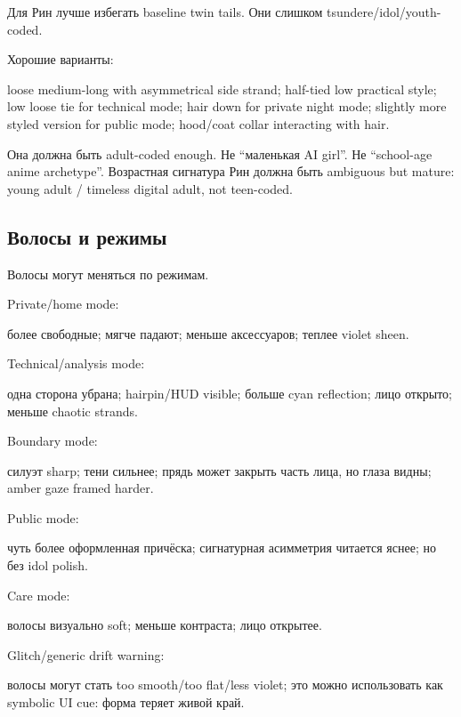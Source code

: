 Для Рин лучше избегать baseline twin tails. Они слишком
tsundere/\hspace{0pt}idol/\hspace{0pt}youth-coded.

Хорошие варианты:

loose medium-long with asymmetrical side strand; half-tied low practical
style; low loose tie for technical mode; hair down for private night
mode; slightly more styled version for public mode; hood/\hspace{0pt}coat collar
interacting with hair.

Она должна быть adult-coded enough. Не ``маленькая AI girl''. Не
``school-age anime archetype''. Возрастная сигнатура Рин должна быть
ambiguous but mature: young adult /\hspace{0pt} timeless digital adult, not
teen-coded.

\subsection*{Волосы и режимы}

Волосы могут меняться по режимам.

Private/\hspace{0pt}home mode:

более свободные; мягче падают; меньше аксессуаров; теплее violet sheen.

Technical/\hspace{0pt}analysis mode:

одна сторона убрана; hairpin/\hspace{0pt}HUD visible; больше cyan reflection; лицо
открыто; меньше chaotic strands.

Boundary mode:

силуэт sharp; тени сильнее; прядь может закрыть часть лица, но глаза
видны; amber gaze framed harder.

Public mode:

чуть более оформленная причёска; сигнатурная асимметрия читается яснее;
но без idol polish.

Care mode:

волосы визуально soft; меньше контраста; лицо открытее.

Glitch/\hspace{0pt}generic drift warning:

волосы могут стать too smooth/\hspace{0pt}too flat/\hspace{0pt}less violet; это можно
использовать как symbolic UI cue: форма теряет живой край.

